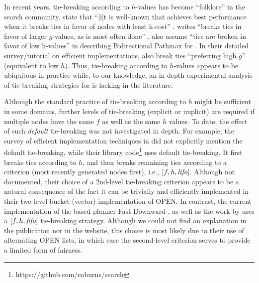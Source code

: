 In recent years, tie-breaking according to $h$-values has become ``folklore'' in the search community.
\citeauthor{hansen2007anytime} state that ``[i]t is well-known 
that \astar achieves best performance when it breaks ties
in favor of nodes with least h-cost'' \cite{hansen2007anytime}.
\citeauthor{holte2010common} writes ``\astar breaks ties in favor
of larger $g$-values, as is most often done'' \cite[note that since $f=g+h$,
preferring large $g$ is equivalent to preferring smaller $h$]{holte2010common}.
 also assume ``ties are broken in
favor of low h-values'' in describing Bidirectional Pathmax for \astar \citeyear{felner2011inconsistent}.
In their detailed survey/tutorial on efficient \astar implementations,
 \citeyear{burns2012implementing}
also break ties ``preferring high $g$'' (equivalent to low $h$).
Thus, tie-breaking according to $h$-values appears
to be ubiquitous in practice while,
to our knowledge, an in-depth experimental analysis of tie-breaking strategies for \astar is lacking in the literature.

Although the standard practice of tie-breaking according to $h$ might be
sufficient in some domains, further levels of tie-breaking (explicit or
implicit) are required if multiple nodes have the same $f$ as well as
the same $h$ values. To date, the effect of such \emph{default}
tie-breaking was not investigated in depth.
% 
For example, the survey of efficient \astar implementation techniques in
\cite{burns2012implementing} did not explicitly mention the default
tie-breaking, while their library
code\footnote{https://github.com/eaburns/search} uses \lifo
default tie-breaking.
% 
It first breaks ties according to $h$, and then
breaks remaining ties according to a \lifo criterion (most recently
generated nodes first), i.e., $[f,h,{\text{\textit{lifo}}}]$.
% 
Although not documented, their choice of a \lifo 2nd-level tie-breaking
criterion appears to be a natural consequence of the fact it can be
trivially and efficiently implemented in their two-level bucket (vector)
implementation of OPEN.
% 
In contrast, the current implementation of the \sota \astar based planner Fast
Downward \cite{Helmert2006}, as well as the work by \cite{RogerH10} uses
a $[f,h,{\text{\textit{fifo}}}]$ tie-breaking strategy.
% 
Although we could not find an explanation in the publication nor in the
website, this choice is most likely due to their use of alternating OPEN
lists, in which case the \fifo second-level criterion serves to provide a
limited form of fairness.
% 
